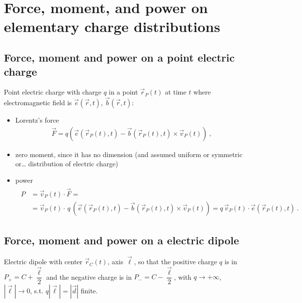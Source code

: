 \documentclass[letterpaper,10pt,english]{jupyterBook}
\begin{document}
\sphinxstepscope




\section{Force, moment, and power on elementary charge distributions}
\label{\detokenize{ch/forces-moments-on-charges:force-moment-and-power-on-elementary-charge-distributions}}\label{\detokenize{ch/forces-moments-on-charges:classical-electromagnetism-forces-moments}}\label{\detokenize{ch/forces-moments-on-charges::doc}}

\subsection{Force, moment and power on a point electric charge}
\label{\detokenize{ch/forces-moments-on-charges:force-moment-and-power-on-a-point-electric-charge}}
\sphinxAtStartPar
Point electric charge with charge \(q\) in a point \(\vec{r}_P(t)\) at time \(t\) where electromagnetic field is \(\vec{e}(\vec{r},t)\), \(\vec{b}(\vec{r},t)\):
\begin{itemize}
\item {} 
\sphinxAtStartPar
Lorentz’s force
\begin{equation*}
\begin{split}\vec{F} = q \left( \vec{e}(\vec{r}_P(t), t) - \vec{b}(\vec{r}_P(t),t) \times \vec{v}_P(t) \right) \ ,\end{split}
\end{equation*}
\item {} 
\sphinxAtStartPar
zero moment, since it has no dimension (and assumed uniform or symmetric or… distribution of electric charge)

\item {} 
\sphinxAtStartPar
power
\begin{equation*}
\begin{split}\begin{aligned}
     P & = \vec{v}_P(t) \cdot \vec{F} = \\
       & = \vec{v}_P(t) \cdot \, q \, \left( \vec{e}(\vec{r}_P(t), t) - \vec{b}(\vec{r}_P(t), t) \times \vec{v}_P(t) \right) = q \, \vec{v}_P(t) \cdot \vec{e}(\vec{r}_P(t),t) \ .
   \end{aligned}\end{split}
\end{equation*}
\end{itemize}


\subsection{Force, moment and power on a electric dipole}
\label{\detokenize{ch/forces-moments-on-charges:force-moment-and-power-on-a-electric-dipole}}
\sphinxAtStartPar
Electric dipole with center \(\vec{r}_C(t)\), axis \(\vec{\ell}\), so that the positive charge \(q\) is in \(P_+ = C + \dfrac{\vec{\ell}}{2}\) and the negative charge is in \(P_- = C - \dfrac{\vec{\ell}}{2}\), with \(q \rightarrow +\infty\), \(|\vec{\ell}| \rightarrow 0\), s.t. \(q|\vec{\ell}| = |\vec{d}|\) finite.
\end{document}
